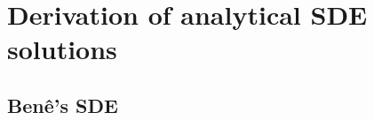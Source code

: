 \chapter{Derivation of analytical SDE solutions}



\section{Ben\^e's SDE}\label{app:bene_calculations}
